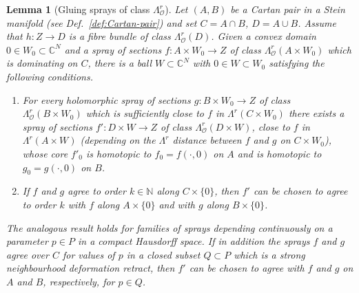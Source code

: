 \documentclass[11pt]{amsart}
\numberwithin{equation}{section}
\newtheorem{lemma}[theorem]{Lemma}
\theoremstyle{definition}
\newcommand\Oscr{\mathscr{O}}
\newcommand\C{\mathbb{C}}
\newcommand\N{\mathbb{N}}
\begin{document}
%
%
%
%
\begin{lemma}[Gluing sprays of class $\Lambda^r_\Oscr$]
\label{lem:gluing}
Let $(A,B)$ be a Cartan pair in a Stein manifold
(see Def.\ \ref{def:Cartan-pair}) and set $C=A\cap B$, $D=A\cup B$.
Assume that $h:Z\to D$ is a fibre bundle of class $\Lambda^r_\Oscr(D)$.
Given a convex domain $0\in W_0\subset\C^N$ and a spray of sections 
$f:A\times W_0\to Z$ of class $\Lambda^r_\Oscr(A\times W_0)$ 
which is dominating on $C$, there is a ball $W\subset\C^N$ 
with $0\in W \subset W_0$ satisfying the following conditions. 
%
\begin{enumerate}[\rm (a)]
\item 
For every holomorphic spray of sections
$g : B \times W_0 \to Z$ of class $\Lambda^r_\Oscr(B \times W_0)$
which is sufficiently close to $f$ in $\Lambda^r(C \times W_0)$
there exists a spray of sections $f' : D \times W \to Z$
of class $\Lambda^r_\Oscr(D\times W)$, close to $f$ in 
$\Lambda^r(A\times W)$ (depending on the $\Lambda^r$
distance between $f$ and $g$ on $C\times W_0$), 
whose core $f'_0$ is homotopic to $f_0=f(\cdotp,0)$ on $A$
and is homotopic to $g_0=g(\cdotp,0)$ on $B$.
%
\item
If $f$ and $g$ agree to order $k\in \N$ along $C\times\{0\}$, 
then $f'$ can be chosen to agree to order $k$ with $f$ 
along $A\times\{0\}$ and with $g$ along $B \times\{0\}$.
\end{enumerate}
%
The analogous result holds for families of sprays depending
continuously on a parameter $p\in P$ in a compact Hausdorff space.
If in addition the sprays $f$ and $g$ agree over $C$ for values of $p$ 
in a closed subset $Q\subset P$ which is a strong 
neighbourhood deformation retract, 
then $f'$ can be chosen to agree with $f$ and $g$ 
on $A$ and $B$, respectively, for $p\in Q$.
\end{lemma}
\end{document}
